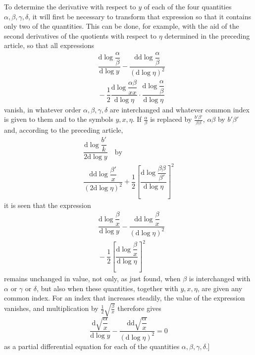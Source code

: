 To determine the derivative with respect to $y$ of each of the four quantities $\alpha,\allowbreak \beta,\allowbreak \gamma,\allowbreak \delta$, it will first be necessary to transform that expression so that it contains only two of the quantities. This can be done, for example, with the aid of the second derivatives of the quotients with respect to $\eta$ determined in the preceding article, so that all expressions
\[
\begin{aligned}&\dfrac{\mathrm d\log\dfrac{\alpha}{\beta}}{\mathrm d\log y}
-\dfrac{\mathrm d\mathrm d\log\dfrac{\alpha}{\beta}}{(\mathrm d\log\eta)^2}
\\[8pt]&{}-\dfrac12\dfrac{\mathrm d\log\dfrac{\alpha\beta}{xx}}{\mathrm d\log\eta}
\cdot\dfrac{\mathrm d\log\dfrac{\alpha}{\beta}}{\mathrm d\log\eta}\end{aligned}
\]
vanish, in whatever order $\alpha,\allowbreak \beta,\allowbreak \gamma,\allowbreak \delta$ are interchanged and whatever common index is given to them and to the symbols $y,\allowbreak x,\allowbreak \eta$. If $\frac{\alpha}{\beta}$ is replaced by $\frac{b'\beta'}{\beta\beta}$, $\alpha\beta$ by $b'\beta'$ and, according to the preceding article,
\[
\begin{gathered}\dfrac{\mathrm d\log\dfrac{b'}{k}}{2\mathrm d\log y}
\quad\text{by}\\[9pt]
\dfrac{\mathrm d\mathrm d\log\dfrac{\beta'}{x}}{(2\mathrm d\log\eta)^2}
+\dfrac12\left[\dfrac{\mathrm d\log\dfrac{\beta\beta}{\beta'}}{\mathrm d\log\eta}\right]^2\end{gathered}
\]
it is seen that the expression
\[
\begin{aligned}&\dfrac{\mathrm d\log\dfrac{\beta}{x}}{\mathrm d\log y}
-\dfrac{\mathrm d\mathrm d\log\dfrac{\beta}{x}}{(\mathrm d\log\eta)^2}
\\[8pt]&{}-\dfrac12\left[\dfrac{\mathrm d\log\dfrac{\beta}{x}}{\mathrm d\log\eta}\right]^2\end{aligned}
\]
remains unchanged in value, not only, as just found, when $\beta$ is interchanged with $\alpha$ or $\gamma$ or $\delta$, but also when these quantities, together with $y,\allowbreak x,\allowbreak \eta$, are given any common index. For an index that increases steadily, the value of the expression vanishes, and multiplication by $\frac12\surd {\frac{\beta}{x}}$ therefore gives
\[
\dfrac{\mathrm d\surd {\dfrac{\alpha}{x}}}{\mathrm d\log y}
-\dfrac{\mathrm d\mathrm d\surd {\dfrac{\alpha}{x}}}{(\mathrm d\log\eta)^2}=0
\]
as a partial differential equation for each of the quantities $\alpha,\allowbreak \beta,\allowbreak \gamma,\allowbreak \delta$.]


